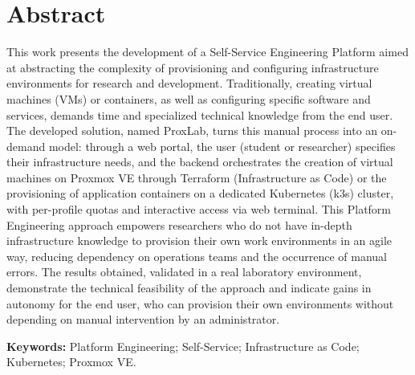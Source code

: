 \chapter*{Abstract}

This work presents the development of a Self-Service Engineering Platform aimed at abstracting the complexity of provisioning and configuring infrastructure environments for research and development. Traditionally, creating virtual machines (VMs) or containers, as well as configuring specific software and services, demands time and specialized technical knowledge from the end user. The developed solution, named ProxLab, turns this manual process into an on-demand model: through a web portal, the user (student or researcher) specifies their infrastructure needs, and the backend orchestrates the creation of virtual machines on Proxmox VE through Terraform (Infrastructure as Code) or the provisioning of application containers on a dedicated Kubernetes (k3s) cluster, with per-profile quotas and interactive access via web terminal. This Platform Engineering approach empowers researchers who do not have in-depth infrastructure knowledge to provision their own work environments in an agile way, reducing dependency on operations teams and the occurrence of manual errors. The results obtained, validated in a real laboratory environment, demonstrate the technical feasibility of the approach and indicate gains in autonomy for the end user, who can provision their own environments without depending on manual intervention by an administrator.

\vfill \textbf{Keywords:} Platform Engineering; Self-Service; Infrastructure as Code; Kubernetes; Proxmox VE.
\\

